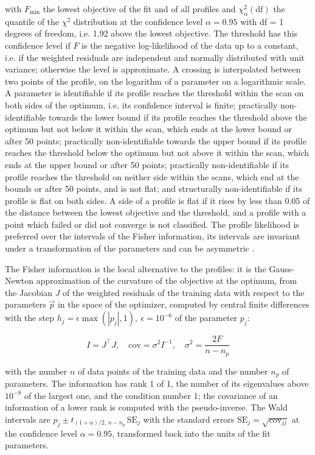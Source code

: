with $F_{\min}$ the lowest objective of the fit and of all profiles and $\chi^2_{\alpha}(\mathrm{df})$ the quantile of the $\chi^2$ distribution at the confidence level $\alpha = 0.95$ with df = 1 degrees of freedom, i.e. 1.92 above the lowest objective. The threshold has this confidence level if $F$ is the negative log-likelihood of the data up to a constant, i.e. if the weighted residuals are independent and normally distributed with unit variance; otherwise the level is approximate. A crossing is interpolated between two points of the profile, on the logarithm of a parameter on a logarithmic scale. A parameter is identifiable if its profile reaches the threshold within the scan on both sides of the optimum, i.e. its confidence interval is finite; practically non-identifiable towards the lower bound if its profile reaches the threshold above the optimum but not below it within the scan, which ends at the lower bound or after 50 points; practically non-identifiable towards the upper bound if its profile reaches the threshold below the optimum but not above it within the scan, which ends at the upper bound or after 50 points; practically non-identifiable if its profile reaches the threshold on neither side within the scans, which end at the bounds or after 50 points, and is not flat; and structurally non-identifiable if its profile is flat on both sides. A side of a profile is flat if it rises by less than 0.05 of the distance between the lowest objective and the threshold, and a profile with a point which failed or did not converge is not classified. The profile likelihood is preferred over the intervals of the Fisher information, its intervals are invariant under a transformation of the parameters and can be asymmetric \cite{Wieland2021}.

The Fisher information is the local alternative to the profiles: it is the Gauss-Newton approximation of the curvature of the objective at the optimum, from the Jacobian $J$ of the weighted residuals of the training data with respect to the parameters $\vec{p}$ in the space of the optimizer, computed by central finite differences with the step $h_j = \epsilon \max(|p_j|, 1),\ \epsilon = 10^{-6}$ of the parameter $p_j$:

\begin{equation}
I = J^\top J, \quad \mathrm{cov} = \sigma^2 I^{-1}, \quad \sigma^2 = \frac{2 F}{n - n_p}
\end{equation}

with the number $n$ of data points of the training data and the number $n_p$ of parameters. The information has rank 1 of 1, the number of its eigenvalues above $10^{-8}$ of the largest one, and the condition number 1; the covariance of an information of a lower rank is computed with the pseudo-inverse. The Wald intervals are $\hat{p}_j \pm t_{(1+\alpha)/2,\, n-n_p}\, \mathrm{SE}_j$ with the standard errors $\mathrm{SE}_j = \sqrt{\mathrm{cov}_{jj}}$ at the confidence level $\alpha = 0.95$, transformed back into the units of the fit parameters.

